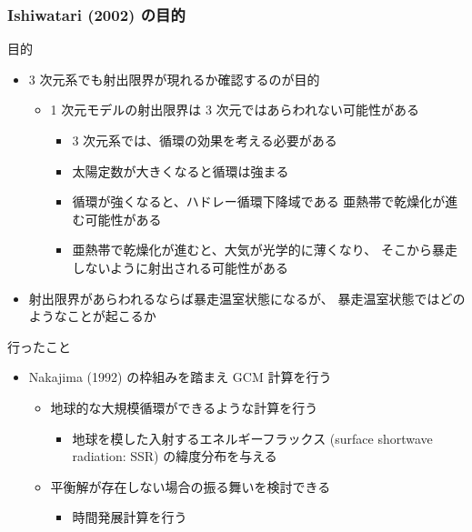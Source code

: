 \documentclass[aspectratio=149,9pt,fleqn]{beamer}
\begin{document}
\begin{frame}
	\frametitle{Ishiwatari \etal (2002) の目的}
	\begin{desc}
		\item[目的]\leavevmode
			\begin{itemize}
				\item 3 次元系でも射出限界が現れるか確認するのが目的
					\begin{itemize}
						\item 1 次元モデルの射出限界は 3 次元ではあらわれない可能性がある
							\begin{itemize}
								\item 3 次元系では、循環の効果を考える必要がある
								\item 太陽定数が大きくなると循環は強まる
								\item 循環が強くなると、ハドレー循環下降域である
									亜熱帯で乾燥化が進む可能性がある
								\item 亜熱帯で乾燥化が進むと、大気が光学的に薄くなり、
									そこから暴走しないように射出される可能性がある
							\end{itemize}
					\end{itemize}
				\item 射出限界があらわれるならば暴走温室状態になるが、
					暴走温室状態ではどのようなことが起こるか
			\end{itemize}
		\item[行ったこと]\leavevmode
			\begin{itemize}
				\item Nakajima \etal (1992) の枠組みを踏まえ GCM 計算を行う
					\begin{itemize}
						\item 地球的な大規模循環ができるような計算を行う
							\begin{itemize}
								\item 地球を模した入射するエネルギーフラックス
									(surface shortwave radiation: SSR)
									の緯度分布を与える
							\end{itemize}
						\item 平衡解が存在しない場合の振る舞いを検討できる
							\begin{itemize}
								\item 時間発展計算を行う
							\end{itemize}
					\end{itemize}
			\end{itemize}
	\end{desc}
\end{frame}
\end{document}

